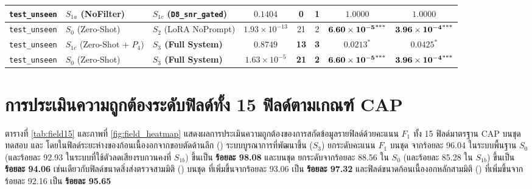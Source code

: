 \begin{table}[H]
{\begin{tabular}{|l|l|l|c|c|c|c|c|}
\hline
\texttt{test\_unseen} & $S_{1a}$ (NoFilter) & $S_{1c}$ (\texttt{D8\_snr\_gated}) & $0.1404$ & 0 & 1 & $1.0000$ & $1.0000$ \\
\hline
\texttt{test\_unseen} & $S_0$ (Zero-Shot) & $S_2$ (LoRA NoPrompt) & $1.93 \times 10^{-13}$ & 21 & 2 & $\mathbf{6.60 \times 10^{-5}}\textsuperscript{***}$ & $\mathbf{3.96 \times 10^{-4}}\textsuperscript{***}$ \\
\hline
\texttt{test\_unseen} & $S_{1c}$ (Zero-Shot + $P_4$) & \textbf{$S_3$ (Full System)} & $0.8749$ & \textbf{13} & \textbf{3} & $\mathbf{0.0213^*}$ & $\mathbf{0.0425^*}$ \\
\hline
\texttt{test\_unseen} & $S_0$ (Zero-Shot) & \textbf{$S_3$ (Full System)} & $1.63 \times 10^{-5}$ & \textbf{21} & \textbf{2} & $\mathbf{6.60 \times 10^{-5}}\textsuperscript{***}$ & $\mathbf{3.96 \times 10^{-4}}\textsuperscript{***}$ \\
\hline
\end{tabular}%
}
\end{table}

\section{การประเมินความถูกต้องระดับฟิลด์ทั้ง 15 ฟิลด์ตามเกณฑ์ CAP}
\label{sec:fieldeval}

ตารางที่ \ref{tab:field15} และภาพที่ \ref{fig:field_heatmap} แสดงผลการประเมินความถูกต้องของการสกัดข้อมูลรายฟิลด์ด้วยคะแนน $F_1$ ทั้ง 15 ฟิลด์มาตรฐาน CAP บนชุดทดสอบ  และ  โดยในฟิลด์ระยะห่างของก้อนเนื้องอกจากขอบตัดด้านลึก () ระบบบูรณาการที่พัฒนาขึ้น ($S_3$) ยกระดับคะแนน $F_1$ บนชุด  จากร้อยละ 96.04 ในระบบพื้นฐาน $S_0$ (และร้อยละ 92.93 ในระบบที่ใช้ตัวลดเสียงรบกวนคงที่ $S_{1b}$) ขึ้นเป็น \textbf{ร้อยละ 98.08} และบนชุด  ยกระดับจากร้อยละ 88.56 ใน $S_0$ (และร้อยละ 85.28 ใน $S_{1b}$) ขึ้นเป็น \textbf{ร้อยละ 94.06} เช่นเดียวกับฟิลด์ขนาดสิ่งส่งตรวจสามมิติ () บนชุด  ที่เพิ่มขึ้นจากร้อยละ 93.06 เป็น \textbf{ร้อยละ 97.32} และฟิลด์ขนาดก้อนเนื้องอกหลักสามมิติ () ที่เพิ่มขึ้นจากร้อยละ 92.16 เป็น \textbf{ร้อยละ 95.65}

